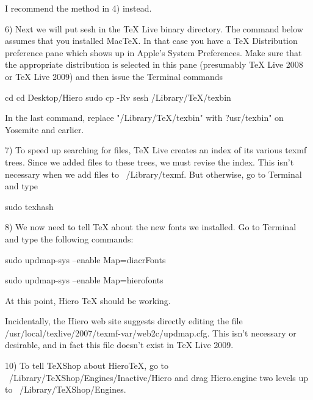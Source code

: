 I recommend the method in 4) instead.

6) Next we will put sesh in the TeX Live binary directory. The command below assumes that you installed MacTeX. In that case you have a TeX Distribution preference pane which shows up in Apple's System Preferences. Make sure that the appropriate distribution is selected in this pane (presumably TeX Live 2008 or TeX Live 2009) and then issue the Terminal commands
	
	cd 
	cd Desktop/Hiero
	sudo cp -Rv sesh /Library/TeX/texbin

    In the last command, replace "/Library/TeX/texbin" with ?usr/texbin" on Yosemite and earlier.
	
7) To speed up searching for files, TeX Live creates an index of its various texmf trees. Since we added files to these trees, we must revise the index. This isn't necessary when we add files to ~/Library/texmf. But otherwise, go to Terminal and type

	sudo texhash
	
8) We now need to tell TeX about the new fonts we installed. Go to Terminal and type the following commands:

	sudo updmap-sys --enable Map=diacrFonts

	sudo updmap-sys --enable Map=hierofonts
	
At this point, Hiero TeX should be working.
	
Incidentally, the Hiero web site suggests directly editing the file /usr/local/texlive/2007/texmf-var/web2c/updmap.cfg. This isn't necessary or desirable, and in fact this file doesn't exist in TeX Live 2009.
	
10) To tell TeXShop about HieroTeX, go to ~/Library/TeXShop/Engines/Inactive/Hiero and drag Hiero.engine two levels up to ~/Library/TeXShop/Engines.



	
	
	